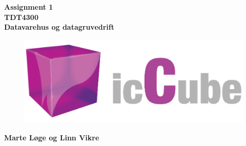 \begin{titlepage}
\begin{center}

{\Huge \bf Assignment 1} \\[1.0cm]
{\Huge \bf TDT4300} \\[1.0cm]
{\Large \bf Datavarehus og datagruvedrift}\\[4.0cm]

\begin{figure}[H]
	\includegraphics[width=\textwidth]{pics/iccube.png}
\end{figure}

\vspace{6cm}

{\Large \bf Marte Løge og Linn Vikre}


\end{center}
\end{titlepage}